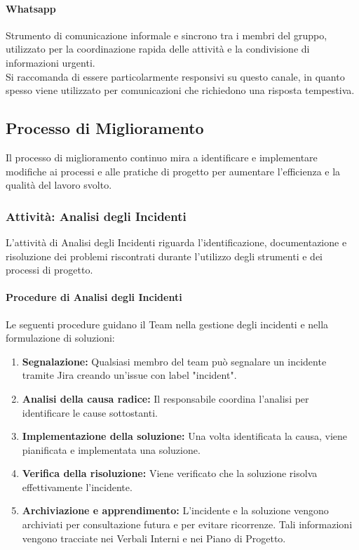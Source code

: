 \documentclass[a4paper,12pt]{article}
\begin{document}
\paragraph{Whatsapp}
Strumento di comunicazione informale e sincrono tra i membri del gruppo, utilizzato per la coordinazione rapida delle attività e la condivisione di informazioni urgenti.\\
Si raccomanda di essere particolarmente responsivi su questo canale, in quanto spesso viene utilizzato per comunicazioni che richiedono una risposta tempestiva.

\subsection{Processo di Miglioramento} \label{processo_miglioramento}
Il processo di miglioramento continuo mira a identificare e implementare
modifiche ai processi e alle pratiche di progetto per aumentare l'efficienza
e la qualità del lavoro svolto.

\subsubsection{Attività: Analisi degli Incidenti} \label{analisi_incidenti}
L'attività di Analisi degli Incidenti riguarda l'identificazione, documentazione e risoluzione dei problemi riscontrati durante l'utilizzo degli strumenti e dei processi di progetto.
\paragraph{Procedure di Analisi degli Incidenti}
Le seguenti procedure guidano il Team nella gestione degli incidenti e nella formulazione di soluzioni:
\begin{enumerate}
    \item \textbf{Segnalazione:} Qualsiasi membro del team può segnalare un incidente tramite Jira creando un'issue con label "incident".
    \item \textbf{Analisi della causa radice:} Il responsabile coordina l'analisi per identificare le cause sottostanti.
    \item \textbf{Implementazione della soluzione:} Una volta identificata la causa, viene pianificata e implementata una soluzione.
    \item \textbf{Verifica della risoluzione:} Viene verificato che la soluzione risolva effettivamente l'incidente.
    \item \textbf{Archiviazione e apprendimento:} L'incidente e la soluzione vengono archiviati per consultazione futura e per evitare ricorrenze. Tali informazioni vengono tracciate nei Verbali Interni e nei Piano di Progetto.
\end{enumerate}
\end{document}
